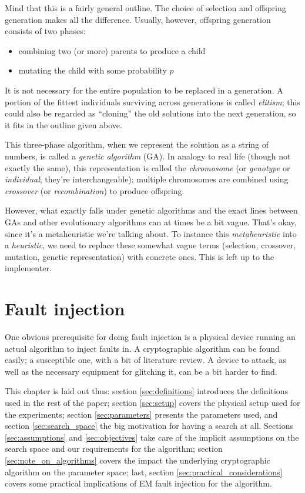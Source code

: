 \documentclass[times, utf8, diplomski]{fer}
\begin{document}
Mind that this is a fairly general outline.
The choice of selection and offspring generation makes all the difference.
Usually, however, offspring generation consists of two phases:
\begin{itemize}
    \item combining two (or more) parents to produce a child
    \item mutating the child with some probability $p$
\end{itemize}
It is not necessary for the entire population to be replaced in a generation.
A portion of the fittest individuals surviving across generations is called
\emph{elitism}; this could also be regarded as ``cloning'' the old solutions into
the next generation, so it fits in the outline given above.

This three-phase algorithm, when we represent the solution as a string of numbers,
is called a \emph{genetic algorithm} (GA).
In analogy to real life (though not exactly the same), this representation is
called the \emph{chromosome} (or \emph{genotype} or \emph{individual}; they're
interchangeable); multiple chromosomes are combined using \emph{crossover}
(or \emph{recombination}) to produce offspring.

However, what exactly falls under genetic algorithms and the exact lines between
GAs and other evolutionary algorithms can at times be a bit vague. That's okay,
since it's a metaheuristic we're talking about.
To instance this \emph{metaheuristic} into a \emph{heuristic}, we need to replace
these somewhat vague terms (selection, crossover, mutation, genetic representation)
with concrete ones. This is left up to the implementer.



\chapter{Fault injection}\label{ch:fault_injection}
One obvious prerequisite for doing fault injection is a physical device running
an actual algorithm to inject faults in. A cryptographic algorithm can be found
easily; a susceptible one, with a bit of literature review. A device to
attack, as well as the necessary equipment for glitching it, can be a bit harder
to find.

This chapter is laid out thus: section \ref{sec:definitions} introduces the
definitions used in the rest of the paper; section \ref{sec:setup} covers
the physical setup used for the experiments; section \ref{sec:parameters}
presents the parameters used, and section \ref{sec:search_space} the big
motivation for having a search at all. Sections \ref{sec:assumptions} and
\ref{sec:objectives} take care of the implicit assumptions on the search
space and our requirements for the algorithm; section \ref{sec:note_on_algorithms}
covers the impact the underlying cryptographic algorithm on the parameter
space; last, section \ref{sec:practical_considerations} covers some practical
implications of EM fault injection for the algorithm.
\end{document}
